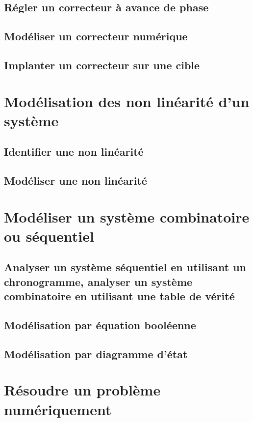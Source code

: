 \section{Régler un correcteur à avance de phase} 
\graphicspath{{\repStyle/png/}{../COR/COR-04-AP/65_Eclipse_03/images/}} 
 
 
\section{Modéliser un correcteur numérique} 
\section{Implanter un correcteur sur une cible} 
\setchapterpreamble[u]{\margintoc} 
\chapter{Modélisation des non linéarité d'un système} 
\section{Identifier une non linéarité} 
\section{Modéliser une non linéarité} 
\setchapterpreamble[u]{\margintoc} 
\chapter{Modéliser un système combinatoire ou séquentiel} 
\section{Analyser un système séquentiel en utilisant un chronogramme, analyser un système combinatoire en utilisant une table de vérité} 
\section{Modélisation par équation booléenne} 
\section{Modélisation par diagramme d'état} 
\setchapterpreamble[u]{\margintoc} 
\chapter{Résoudre un problème numériquement} 
